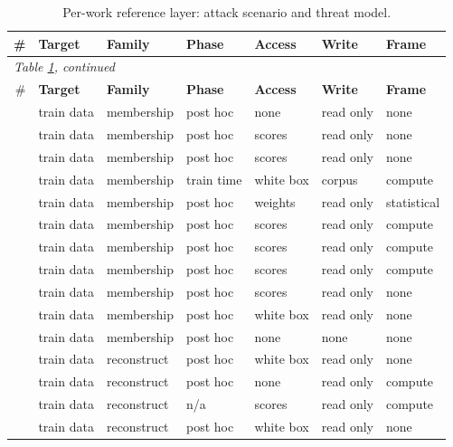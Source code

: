 \begin{landscape}
\begingroup\scriptsize\setlength{\tabcolsep}{4pt}
\begin{longtable}{rllllll}
\caption{Per-work reference layer: attack scenario and threat model.}\label{tab:scenario}\\
\toprule \# & \textbf{Target} & \textbf{Family} & \textbf{Phase} & \textbf{Access} & \textbf{Write} & \textbf{Frame} \\ \midrule\endfirsthead
\multicolumn{7}{l}{\emph{Table \ref{tab:scenario}, continued}}\\
\toprule \# & \textbf{Target} & \textbf{Family} & \textbf{Phase} & \textbf{Access} & \textbf{Write} & \textbf{Frame} \\ \midrule\endhead
\bottomrule\endfoot
\cite{DZT25} & train data & membership & post hoc & none & read only & none \\
\cite{RL21} & train data & membership & post hoc & scores & read only & none \\
\cite{DSMMSZTCEH24} & train data & membership & post hoc & scores & read only & none \\
\cite{VDKMR26} & train data & membership & train time & white box & corpus & compute \\
\cite{HSU25} & train data & membership & post hoc & weights & read only & statistical \\
\cite{SSSS17} & train data & membership & post hoc & scores & read only & compute \\
\cite{ZDKT25} & train data & membership & post hoc & scores & read only & compute \\
\cite{CCNSTT22} & train data & membership & post hoc & scores & read only & compute \\
\cite{AZT24} & train data & membership & post hoc & scores & read only & none \\
\cite{YGFJ18} & train data & membership & post hoc & white box & read only & none \\
\cite{MSJFRM25} & train data & membership & post hoc & none & none & none \\
\cite{CHSS24} & train data & reconstruct & post hoc & white box & read only & none \\
\cite{CKMMNST24} & train data & reconstruct & post hoc & none & read only & compute \\
\cite{DN03} & train data & reconstruct & n/a & scores & read only & compute \\
\cite{KMNS25} & train data & reconstruct & post hoc & white box & read only & none \\

\end{longtable}
\end{landscape}
